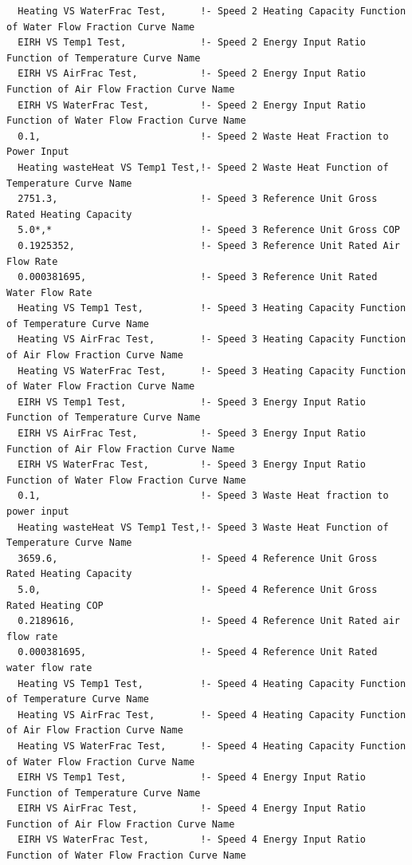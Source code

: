 \begin{lstlisting}
  Heating VS WaterFrac Test,      !- Speed 2 Heating Capacity Function of Water Flow Fraction Curve Name
  EIRH VS Temp1 Test,             !- Speed 2 Energy Input Ratio Function of Temperature Curve Name
  EIRH VS AirFrac Test,           !- Speed 2 Energy Input Ratio Function of Air Flow Fraction Curve Name
  EIRH VS WaterFrac Test,         !- Speed 2 Energy Input Ratio Function of Water Flow Fraction Curve Name
  0.1,                            !- Speed 2 Waste Heat Fraction to Power Input
  Heating wasteHeat VS Temp1 Test,!- Speed 2 Waste Heat Function of Temperature Curve Name
  2751.3,                         !- Speed 3 Reference Unit Gross Rated Heating Capacity
  5.0*,*                          !- Speed 3 Reference Unit Gross COP
  0.1925352,                      !- Speed 3 Reference Unit Rated Air Flow Rate
  0.000381695,                    !- Speed 3 Reference Unit Rated Water Flow Rate
  Heating VS Temp1 Test,          !- Speed 3 Heating Capacity Function of Temperature Curve Name
  Heating VS AirFrac Test,        !- Speed 3 Heating Capacity Function of Air Flow Fraction Curve Name
  Heating VS WaterFrac Test,      !- Speed 3 Heating Capacity Function of Water Flow Fraction Curve Name
  EIRH VS Temp1 Test,             !- Speed 3 Energy Input Ratio Function of Temperature Curve Name
  EIRH VS AirFrac Test,           !- Speed 3 Energy Input Ratio Function of Air Flow Fraction Curve Name
  EIRH VS WaterFrac Test,         !- Speed 3 Energy Input Ratio Function of Water Flow Fraction Curve Name
  0.1,                            !- Speed 3 Waste Heat fraction to power input
  Heating wasteHeat VS Temp1 Test,!- Speed 3 Waste Heat Function of Temperature Curve Name
  3659.6,                         !- Speed 4 Reference Unit Gross Rated Heating Capacity
  5.0,                            !- Speed 4 Reference Unit Gross Rated Heating COP
  0.2189616,                      !- Speed 4 Reference Unit Rated air flow rate
  0.000381695,                    !- Speed 4 Reference Unit Rated water flow rate
  Heating VS Temp1 Test,          !- Speed 4 Heating Capacity Function of Temperature Curve Name
  Heating VS AirFrac Test,        !- Speed 4 Heating Capacity Function of Air Flow Fraction Curve Name
  Heating VS WaterFrac Test,      !- Speed 4 Heating Capacity Function of Water Flow Fraction Curve Name
  EIRH VS Temp1 Test,             !- Speed 4 Energy Input Ratio Function of Temperature Curve Name
  EIRH VS AirFrac Test,           !- Speed 4 Energy Input Ratio Function of Air Flow Fraction Curve Name
  EIRH VS WaterFrac Test,         !- Speed 4 Energy Input Ratio Function of Water Flow Fraction Curve Name

\end{lstlisting}
